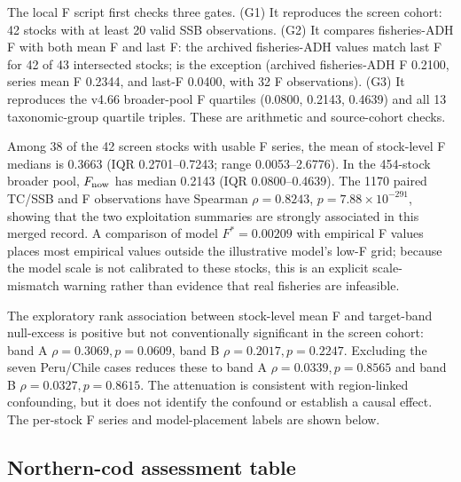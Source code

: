 The local F script first checks three gates. (G1) It reproduces the screen cohort: 42 stocks with at least 20 valid SSB observations. (G2) It compares fisheries-ADH F with both mean F and last F: the archived fisheries-ADH values match last F for 42 of 43 intersected stocks; \texttt{} is the exception (archived fisheries-ADH F 0.2100, series mean F 0.2344, and last-F 0.0400, with 32 F observations). (G3) It reproduces the v4.66 broader-pool F quartiles (0.0800, 0.2143, 0.4639) and all 13 taxonomic-group quartile triples. These are arithmetic and source-cohort checks.

Among 38 of the 42 screen stocks with usable F series, the mean of stock-level F medians is 0.3663 (IQR 0.2701--0.7243; range 0.0053--2.6776). In the 454-stock broader pool, \(F_{\rm now}\) has median 0.2143 (IQR 0.0800--0.4639). The 1170 paired TC/SSB and F observations have Spearman \(\rho=0.8243\), \(p=7.88\times10^{-291}\), showing that the two exploitation summaries are strongly associated in this merged record. A comparison of model \(F^*=0.00209\) with empirical F values places most empirical values outside the illustrative model's low-F grid; because the model scale is not calibrated to these stocks, this is an explicit scale-mismatch warning rather than evidence that real fisheries are infeasible.

The exploratory rank association between stock-level mean F and target-band null-excess is positive but not conventionally significant in the screen cohort: band A \(\rho=0.3069, p=0.0609\), band B \(\rho=0.2017, p=0.2247\). Excluding the seven Peru/Chile cases reduces these to band A \(\rho=0.0339, p=0.8565\) and band B \(\rho=0.0327, p=0.8615\). The attenuation is consistent with region-linked confounding, but it does not identify the confound or establish a causal effect. The per-stock F series and model-placement labels are shown below.



\subsection{Northern-cod assessment table}

